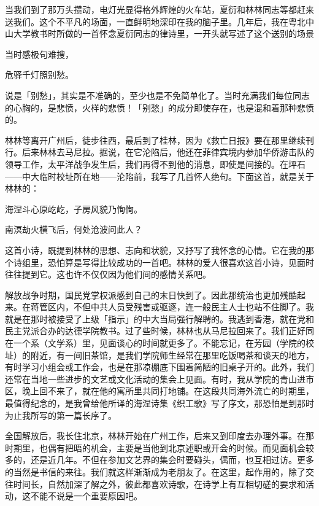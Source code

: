 {    当我们到了那万头攒动，电灯光显得格外辉煌的火车站，夏衍和林林同志等都赶来送我们。这个不平凡的场面，一直鲜明地深印在我的脑子里。几年后，我在粤北中山大学教书时所做的一首怀念夏衍同志的律诗里，一开头就写述了这个送别的场景
    \begin{center}
        当时感极句难搜，

        危驿千灯照别愁。
    \end{center}

    说是「别愁」，其实是不准确的，至少也是不免简单化了。当时充满我们每位同志的心胸的，是悲愤，火样的悲愤！「别愁」的成分即使存在，也是混和着那种悲愤的。

    林林等离开广州后，徒步往西，最后到了桂林，因为《救亡日报》要在那里继续刊行。后来林林去马尼拉。据说，在它沦陷后，他还在菲律宾境内参加华侨游击队的领导工作，太平洋战争发生后，我们再得不到他的消息，即使是间接的。在坪石——中大临时校址所在地——沦陷前，我写了几首怀人绝句。下面这首，就是关于林林的：
    \begin{center}
        海涅斗心原屹屹，子房风貌乃恂恂。

        南溟劫火横飞后，何处沧波问此人？
    \end{center}

    这首小诗，既提到林林的思想、志向和状貌，又抒写了我怀念的心情。它在我的那个诗组里，恐怕算是写得比较成功的一首吧。林林的爱人很喜欢这首小诗，见面时往往提到它。这也许不仅仅因为他们间的感情关系吧。

    解放战争时期，国民党掌权派感到自己的末日快到了。因此那统治也更加残酷起来。在蒋管区内，不但中共人员受残害或驱逐，连一般民主人士也站不住脚了。我就是在那时被接受了上级「指示」的中大当局强行解聘的。我逃到香港，就在党和民主党派合办的达德学院教书。过了些时候，林林也从马尼拉回来了。我们正好同在一个系（文学系）里，见面谈心的时间就更多了。不能忘记，在芳园（学院的校址）的附近，有一间旧茶馆，是我们学院师生经常在那里吃饭喝茶和谈天的地方，有时学习小组会或工作会，也是在那凉棚底下围着简陋的旧桌子开的。此外，我们还常在当地一些进步的文艺或文化活动的集会上见面。有时，我从学院的青山进市区，晚上回不来了，就在他的寓所里共同打地铺。在这段共同海外流亡的时期里，最值得纪念的，是我曾给他所译的海涅诗集《织工歌》写了序文，那恐怕是到那时为止我所写的第一篇长序了。

    全国解放后，我长住北京，林林开始在广州工作，后来又到印度去办理外事。在那时期里，也偶有把晤的机会，主要是当他到北京述职或开会的时候。而见面机会较多的，还是近几年。不但在参加文艺界的集会时要碰头，偶而，也互相过访。更多的当然是书信的来往。我们就这样渐渐成为老朋友了。在这里，起作用的，除了交往时间长，自然加深了解之外，彼此都喜欢诗歌，在诗学上有互相切磋的要求和活动，这不能不说是一个重要原因吧。

}
